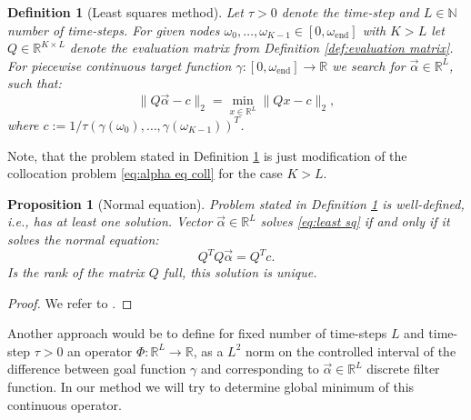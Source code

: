 \documentclass[a4paper,11pt,bibliography=totoc,listof=totoc,headinclude=true,cleardoublepage=empty,oneside]{scrbook}
\newtheorem{definition}[theorem]{Definition}
\newtheorem{prop}[theorem]{Proposition}
\newcommand{\R}{\mathbb{R}}
\newcommand{\N}{\mathbb{N}}
\newcommand{\e}{\mathrm{end}}
\begin{document}
\begin{definition}[Least squares method]\label{def:least sq}
    Let $\tau>0$ denote the time-step and $L \in \N$ number of time-steps. For given nodes $\omega_0, \dots, \omega_{K-1} \in [0, \omega_\e]$ with $K>L$ let $Q\in\R^{K\times L}$ denote the evaluation matrix from Definition \ref{def:evaluation matrix}. For piecewise continuous target function $\gamma : [0, \omega_\e] \rightarrow \R$ we search for $\Vec{\alpha} \in \R^{L}$, such that:
    \begin{equation}\label{eq:least sq}
        \| Q\vec{\alpha} - c \|_2 = \min_{x\in \R^L} \| Qx - c \|_2,
    \end{equation}
    where $c := 1/\tau \left(\gamma(\omega_0), \dots, \gamma(\omega_{K-1})\right)^T$.
\end{definition}

Note, that the problem stated in Definition \ref{def:least sq} is just modification of the collocation problem \eqref{eq:alpha eq coll} for the case $K>L$.

\begin{prop}[Normal equation]\label{prop:normal eq}
    Problem stated in Definition \ref{def:least sq} is well-defined, i.e., has at least one solution. Vector $\Vec{\alpha} \in \R^{L}$ solves \eqref{eq:least sq} if and only if it solves the normal equation:
    \begin{equation}\label{eq:normal eq}
        Q^T Q \Vec{\alpha} = Q^T c.
    \end{equation}
    Is the rank of the matrix $Q$ full, this solution is unique.
\end{prop}
\begin{proof}
    We refer to \cite[p. 103]{Praetorius}.
\end{proof}

Another approach would be to define for fixed number of time-steps $L$ and time-step $\tau>0$ an operator $\Phi: \R^L \rightarrow \R$, as a $L^2$ norm on the controlled interval of the difference between goal function $\gamma$ and corresponding to $\Vec{\alpha} \in \R^L$ discrete filter function. In our method we will try to determine global minimum of this continuous operator.
\end{document}
